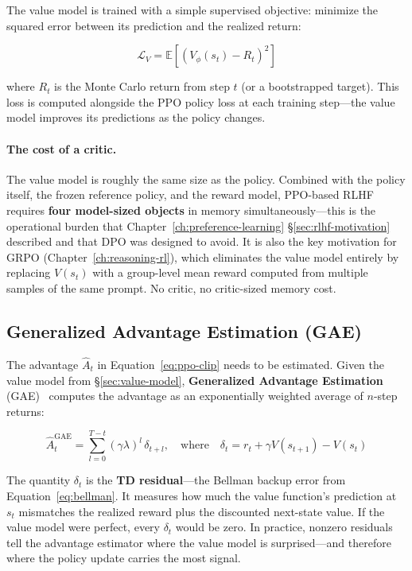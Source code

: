 The value model is trained with a simple supervised objective: minimize the squared error between its prediction and the realized return:

\begin{equation}
\label{eq:value-loss}
\mathcal{L}_V = \mathbb{E}\!\left[\left(V_\phi(s_t) - R_t\right)^2\right]
\end{equation}

where $R_t$ is the Monte Carlo return from step $t$ (or a bootstrapped target). This loss is computed alongside the PPO policy loss at each training step---the value model improves its predictions as the policy changes.

\paragraph{The cost of a critic.} The value model is roughly the same size as the policy. Combined with the policy itself, the frozen reference policy, and the reward model, PPO-based RLHF requires \textbf{four model-sized objects} in memory simultaneously---this is the operational burden that Chapter~\ref{ch:preference-learning} \S\ref{sec:rlhf-motivation} described and that DPO was designed to avoid. It is also the key motivation for GRPO (Chapter~\ref{ch:reasoning-rl}), which eliminates the value model entirely by replacing $V(s_t)$ with a group-level mean reward computed from multiple samples of the same prompt. No critic, no critic-sized memory cost.

\subsection{Generalized Advantage Estimation (GAE)}

The advantage $\hat{A}_t$ in Equation~\ref{eq:ppo-clip} needs to be estimated. Given the value model from \S\ref{sec:value-model}, \textbf{Generalized Advantage Estimation} (GAE)~\cite{schulman2016gae} computes the advantage as an exponentially weighted average of $n$-step returns:

\begin{equation}
\label{eq:gae}
\hat{A}_t^{\text{GAE}} = \sum_{l=0}^{T-t} (\gamma \lambda)^l \, \delta_{t+l}, \quad \text{where} \quad \delta_t = r_t + \gamma V(s_{t+1}) - V(s_t)
\end{equation}

The quantity $\delta_t$ is the \textbf{TD residual}---the Bellman backup error from Equation~\ref{eq:bellman}. It measures how much the value function's prediction at $s_t$ mismatches the realized reward plus the discounted next-state value. If the value model were perfect, every $\delta_t$ would be zero. In practice, nonzero residuals tell the advantage estimator where the value model is surprised---and therefore where the policy update carries the most signal.

